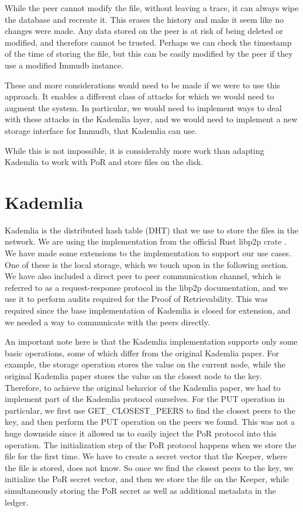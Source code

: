 While the peer cannot modify the file, without leaving a trace,
it can always wipe the database and recreate it.
This erases the history and make it seem like no changes were made.
Any data stored on the peer is at risk of being deleted or modified,
and therefore cannot be trusted.
Perhaps we can check the timestamp of the time of storing the file,
but this can be easily modified by the peer if they use a modified Immudb instance.

These and more considerations would need to be made if we were to use this approach.
It enables a different class of attacks for which we would need to augment the system.
In particular, we would need to implement ways to deal with these attacks in the Kademlia layer,
and we would need to implement a new storage interface for Immudb, that Kademlia can use.

While this is not impossible, it is considerably more work than adapting Kademlia to
work with PoR and store files on the disk.

\section{Kademlia}

Kademlia is the distributed hash table (DHT) that we use to store the files in the network.
We are using the implementation from the official Rust libp2p crate \cite{rustlibp2p}.
We have made some extensions to the implementation to support our use cases.
One of these is the local storage, which we touch upon in the following section.
We have also included a direct peer to peer communication channel,
which is referred to as a request-response protocol in the libp2p documentation,
and we use it to perform audits required for the Proof of Retrievability.
This was required since the base implementation of Kademlia is closed for extension,
and we needed a way to communicate with the peers directly.

An important note here is that the Kademlia implementation supports only some basic operations,
some of which differ from the original Kademlia paper.
For example, the storage operation stores the value on the current node,
while the original Kademlia paper stores the value on the closest node to the key.
Therefore, to achieve the original behavior of the Kademlia paper,
we had to implement part of the Kademlia protocol ourselves.
For the PUT operation in particular, we first use GET\_CLOSEST\_PEERS to find the closest peers to the key,
and then perform the PUT operation on the peers we found.
This was not a huge downside since it allowed us to easily inject the PoR protocol into this operation.
The initialization step of the PoR protocol happens when we store the file for the first time.
We have to create a secret vector that the Keeper, where the file is stored, does not know.
So once we find the closest peers to the key, we initialize the PoR secret vector,
and then we store the file on the Keeper,
while simultaneously storing the PoR secret as well as additional metadata in the ledger.

